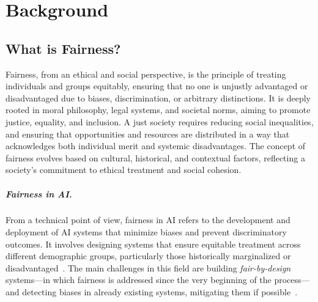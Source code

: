 \documentclass[12pt,a4paper,openright,twoside]{book}
\begin{document}
\chapter{Background}%
\label{chap:background}

\section{What is Fairness?}
%
%
Fairness, from an ethical and social perspective, is the principle of treating individuals and groups equitably, ensuring that no one is unjustly advantaged or disadvantaged due to biases, discrimination, or arbitrary distinctions.
%
It is deeply rooted in moral philosophy, legal systems, and societal norms, aiming to promote justice, equality, and inclusion.
%
A just society requires reducing social inequalities, and ensuring that opportunities and resources are distributed in a way that acknowledges both individual merit and systemic disadvantages.
%
The concept of fairness evolves based on cultural, historical, and contextual factors, reflecting a society’s commitment to ethical treatment and social cohesion.


\paragraph{Fairness in \acs{AI}.}

From a technical point of view, fairness in \ac{AI} refers to the development and deployment of \ac{AI} systems that minimize biases and prevent discriminatory outcomes.
%
It involves designing systems that ensure equitable treatment across different demographic groups, particularly those historically marginalized or disadvantaged~\cite{ai-fairness}.
%
%
The main challenges in this field are building \textit{fair-by-design} systems---in which fairness is addressed since the very beginning of the process---and detecting biases in already existing systems, mitigating them if possible~\cite{kaas2024fairdesign}.
%
\end{document}
